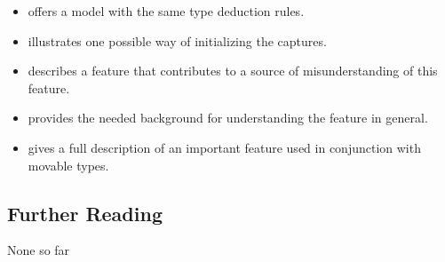 \begin{itemize}

\item{offers a model with the same type deduction rules.}
\item{illustrates one possible way of initializing the captures.}
\item{describes a feature that contributes to a source of misunderstanding of this feature.}
\item{provides the needed background for understanding the feature in general.}
\item{gives a full description of an important feature used in conjunction with movable types.}
\end{itemize}

\subsection[Further Reading]{Further Reading}\label{further-reading}

None so far


